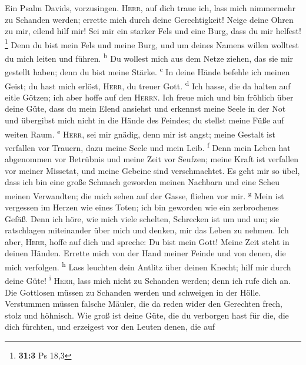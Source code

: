  Ein Psalm Davids, vorzusingen. 
\textsc{Herr}, auf dich traue ich, lass mich nimmermehr zu Schanden
werden; errette mich durch deine Gerechtigkeit!  Neige
deine Ohren zu mir, eilend hilf mir! Sei mir ein starker Fels und eine
Burg, dass du mir helfest! \footnote{\textbf{31:3} Ps 18,3}
 Denn du bist mein Fels und meine Burg, und um deines
Namens willen wolltest du mich leiten und führen. \textsuperscript{b}
 Du wollest mich aus dem Netze ziehen, das sie mir
gestellt haben; denn du bist meine Stärke. \textsuperscript{c}
 In deine Hände befehle ich meinen Geist; du hast mich
erlöst, \textsc{Herr}, du treuer Gott. \textsuperscript{d}
 Ich hasse, die da halten auf eitle Götzen; ich aber hoffe
auf den \textsc{Herrn}.  Ich freue mich und bin fröhlich
über deine Güte, dass du mein Elend ansiehst und erkennst meine Seele in
der Not  und übergibst mich nicht in die Hände des
Feindes; du stellst meine Füße auf weiten Raum. \textsuperscript{e}
 \textsc{Herr}, sei mir gnädig, denn mir ist angst; meine
Gestalt ist verfallen vor Trauern, dazu meine Seele und mein Leib.
\textsuperscript{f}  Denn mein Leben hat abgenommen vor
Betrübnis und meine Zeit vor Seufzen; meine Kraft ist verfallen vor
meiner Missetat, und meine Gebeine sind verschmachtet. 
Es geht mir so übel, dass ich bin eine große Schmach geworden meinen
Nachbarn und eine Scheu meinen Verwandten; die mich sehen auf der Gasse,
fliehen vor mir. \textsuperscript{g}  Mein ist vergessen
im Herzen wie eines Toten; ich bin geworden wie ein zerbrochenes Gefäß.
 Denn ich höre, wie mich viele schelten, Schrecken ist um
und um; sie ratschlagen miteinander über mich und denken, mir das Leben
zu nehmen.  Ich aber, \textsc{Herr}, hoffe auf dich und
spreche: Du bist mein Gott!  Meine Zeit steht in deinen
Händen. Errette mich von der Hand meiner Feinde und von denen, die mich
verfolgen. \textsuperscript{h}  Lass leuchten dein
Antlitz über deinen Knecht; hilf mir durch deine Güte!
\textsuperscript{i}  \textsc{Herr}, lass mich nicht zu
Schanden werden; denn ich rufe dich an. Die Gottlosen müssen zu Schanden
werden und schweigen in der Hölle.  Verstummen müssen
falsche Mäuler, die da reden wider den Gerechten frech, stolz und
höhnisch.  Wie groß ist deine Güte, die du verborgen hast
für die, die dich fürchten, und erzeigest vor den Leuten denen, die auf
